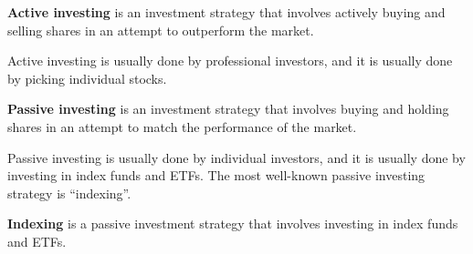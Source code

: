 \textbf{Active investing} is an investment strategy that involves actively buying and selling shares in an attempt to
outperform the market.
\ed

Active investing is usually done by professional investors, and it is usually done by picking individual stocks.

\textbf{Passive investing} is an investment strategy that involves buying and holding shares in an attempt to match
the performance of the market.
\ed

Passive investing is usually done by individual investors, and it is usually done by investing in index funds and ETFs.
The most well-known passive investing strategy is ``indexing''.

\bd[Indexing]
\textbf{Indexing} is a passive investment strategy that involves investing in index funds and ETFs.
\ed

